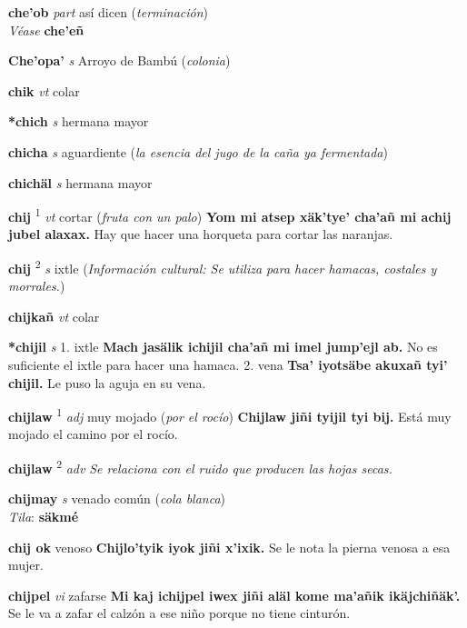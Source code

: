 \documentclass[10pt]{scrbook}
\newcommand{\entry}[1]{\textbf{#1}}
\newcommand{\onedefinition}[1]{#1.}
\newcommand{\defsuperscript}[1]{\textsuperscript{#1}}
\newcommand{\nontranslationdef}[1]{\textit{#1}}
\newcommand{\partofspeech}[1]{\textit{#1}}
\newcommand{\spanishtranslation}[1]{#1}
\newcommand{\clarification}[1]{(\textit{#1})}
\newcommand{\cholexample}[1]{\textbf{#1}}
\newcommand{\exampletranslation}[1]{#1}
\newcommand{\dialectvariant}[1]{\\\textit{#1}:}
\newcommand{\dialectword}[1]{\textbf{#1}}
\newcommand{\alsosee}[1]{\\\textit{Véase} \textbf{#1}}
\newcommand{\culturalinformation}[1]{(\textit{#1})}
\begin{document}
\begin{multicols}{2}
\entry{che'ob}
\partofspeech{part}
\spanishtranslation{así dicen}
\clarification{terminación}
\alsosee{che'eñ}

\entry{Che'opa'}
\partofspeech{s}
\spanishtranslation{Arroyo de Bambú}
\clarification{colonia}

\entry{chik}
\partofspeech{vt}
\spanishtranslation{colar}

\entry{*chich}
\partofspeech{s}
\spanishtranslation{hermana mayor}

\entry{chicha}
\partofspeech{s}
\spanishtranslation{aguardiente}
\clarification{la esencia del jugo de la caña ya fermentada}

\entry{chichäl}
\partofspeech{s}
\spanishtranslation{hermana mayor}

\entry{chij}
\defsuperscript{1}
\partofspeech{vt}
\spanishtranslation{cortar}
\clarification{fruta con un palo}
\cholexample{Yom mi atsep xäk'tye' cha'añ mi achij jubel alaxax.}
\exampletranslation{Hay que hacer una horqueta para cortar las naranjas.}

\entry{chij}
\defsuperscript{2}
\partofspeech{s}
\spanishtranslation{ixtle}
\culturalinformation{Información cultural: Se utiliza para hacer hamacas, costales y morrales.}

\entry{chijkañ}
\partofspeech{vt}
\spanishtranslation{colar}

\entry{*chijil}
\partofspeech{s}
\onedefinition{1}
\spanishtranslation{ixtle}
\cholexample{Mach jasälik ichijil cha'añ mi imel jump'ejl ab.}
\exampletranslation{No es suficiente el ixtle para hacer una hamaca.}
\onedefinition{2}
\spanishtranslation{vena}
\cholexample{Tsa' iyotsäbe akuxañ tyi' chijil.}
\exampletranslation{Le puso la aguja en su vena.}

\entry{chijlaw}
\defsuperscript{1}
\partofspeech{adj}
\spanishtranslation{muy mojado}
\clarification{por el rocío}
\cholexample{Chijlaw jiñi tyijil tyi bij.}
\exampletranslation{Está muy mojado el camino por el rocío.}

\entry{chijlaw}
\defsuperscript{2}
\partofspeech{adv}
\nontranslationdef{Se relaciona con el ruido que producen las hojas secas.}

\entry{chijmay}
\partofspeech{s}
\spanishtranslation{venado común}
\clarification{cola blanca}
\dialectvariant{Tila}
\dialectword{säkmé}

\entry{chij ok}
\spanishtranslation{venoso}
\cholexample{Chijlo'tyik iyok jiñi x'ixik.}
\exampletranslation{Se le nota la pierna venosa a esa mujer.}

\entry{chijpel}
\partofspeech{vi}
\spanishtranslation{zafarse}
\cholexample{Mi kaj ichijpel iwex jiñi aläl kome ma'añik ikäjchiñäk'.}
\exampletranslation{Se le va a zafar el calzón a ese niño porque no tiene cinturón.}


\end{multicols}
\end{document}
